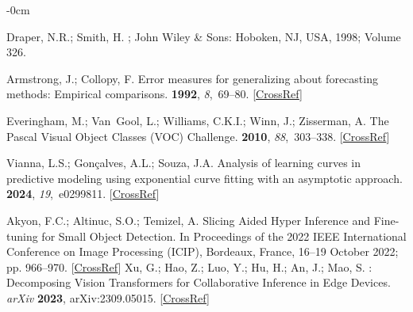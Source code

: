 \documentclass[12pt,a4paper,oneside]{report}
\newlength{\extralength}
\begin{document}
\begin{adjustwidth}{-\extralength}{0cm}
\begin{thebibliography}{999}
Draper, N.R.; Smith, H.
; John Wiley \& Sons: Hoboken, NJ, USA, 1998; Volume 326. 

Armstrong, J.; Collopy, F.
\newblock Error measures for generalizing about forecasting methods: Empirical
comparisons.
 {\bf 1992}, {\em
8},~69--80. [\href{http://dx.doi.org/10.1016/0169-2070(92)90008-W}{CrossRef}]

Everingham, M.; Van~Gool, L.; Williams, C.K.I.; Winn, J.; Zisserman, A.
\newblock The {Pascal} {Visual} {Object} {Classes} ({VOC}) {Challenge}.
 {\bf 2010}, {\em
88},~303--338. [\href{http://dx.doi.org/10.1007/s11263-009-0275-4}{CrossRef}]

Vianna, L.S.; Gonçalves, A.L.; Souza, J.A.
\newblock Analysis of learning curves in predictive modeling using exponential
curve fitting with an asymptotic approach.
 {\bf 2024}, {\em 19},~e0299811. [\href{http://dx.doi.org/10.1371/journal.pone.0299811}{CrossRef}]


Akyon, F.C.; Altinuc, S.O.; Temizel, A.
\newblock Slicing {{Aided Hyper Inference}} and {{Fine-tuning}} for {{Small
Object Detection}}.
\newblock In Proceedings of the 2022 {{IEEE International Conference}} on
{{Image Processing}} ({{ICIP}}), Bordeaux, France, 16--19 October 2022; pp. 966--970. [\href{http://dx.doi.org/10.1109/ICIP46576.2022.9897990}{CrossRef}]
\newpage
{}
Xu, G.; Hao, Z.; Luo, Y.; Hu, H.; An, J.; Mao, S.
: {{Decomposing Vision Transformers}} for {{Collaborative
Inference}} in {{Edge Devices}}. {\em arXiv} {\bf 2023}, arXiv:2309.05015. [\href{http://dx.doi.org/10.1109/TMC.2023.3315138}{CrossRef}]


\end{thebibliography}
\end{adjustwidth}
\end{document}
